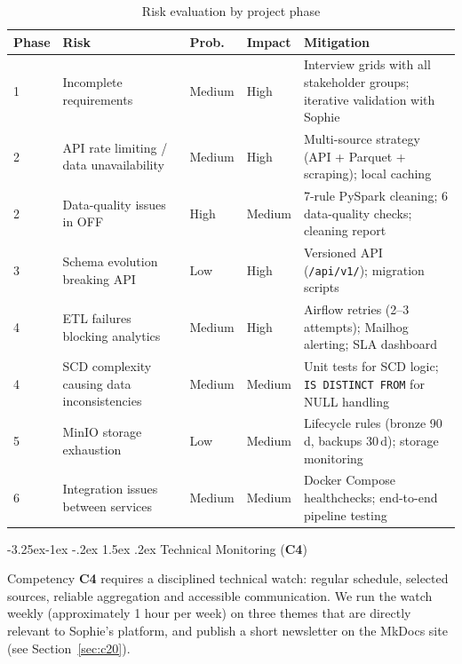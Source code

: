 \documentclass[a4paper,11pt,oneside,openany]{report}
\makeatletter
\renewcommand\subsection{\@startsection{subsection}{2}{\z@}%
  {-3.25ex\@plus -1ex \@minus -.2ex}%
  {1.5ex \@plus .2ex}%
  {\normalfont\large\bfseries\color{ntdarkgreen}}}
\newcommand{\competence}[1]{\textbf{\textcolor{ntgreen}{#1}}}
\makeatother
\begin{document}
\begin{table}[H]
\centering
\caption{Risk evaluation by project phase}
\label{tab:risks}
\begin{tabularx}{\textwidth}{C{1cm} L{3.5cm} C{1.2cm} C{1.2cm} L{4.5cm}}
\toprule
\textbf{Phase} & \textbf{Risk} & \textbf{Prob.} & \textbf{Impact} & \textbf{Mitigation} \\
 & Incomplete requirements & Medium & High & Interview grids with all stakeholder groups; iterative validation with Sophie \\
2 & API rate limiting / data unavailability & Medium & High & Multi-source strategy (API + Parquet + scraping); local caching \\
2 & Data-quality issues in OFF & High & Medium & 7-rule PySpark cleaning; 6 data-quality checks; cleaning report \\
3 & Schema evolution breaking API & Low & High & Versioned API (\texttt{/api/v1/}); migration scripts \\
4 & ETL failures blocking analytics & Medium & High & Airflow retries (2--3 attempts); Mailhog alerting; SLA dashboard \\
4 & SCD complexity causing data inconsistencies & Medium & Medium & Unit tests for SCD logic; \texttt{IS DISTINCT FROM} for NULL handling \\
5 & MinIO storage exhaustion & Low & Medium & Lifecycle rules (bronze 90\,d, backups 30\,d); storage monitoring \\
6 & Integration issues between services & Medium & Medium & Docker Compose healthchecks; end-to-end pipeline testing \\
\bottomrule
\end{tabularx}
\end{table}

\subsection{Technical Monitoring (\competence{C4})}

Competency \competence{C4} requires a disciplined technical watch:
regular schedule, selected sources, reliable aggregation and
accessible communication. We run the watch weekly (approximately
1 hour per week) on three themes that are directly relevant to
Sophie's platform, and publish a short newsletter on the MkDocs
site (see Section~\ref{sec:c20}).
\end{document}
